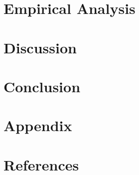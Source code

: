 \documentclass[
  12pt,
  a4paper,
  oneside]{article}
\begin{document}
\section{Empirical Analysis}\label{empirical-analysis}

\section{Discussion}\label{discussion}

\section{Conclusion}\label{conclusion}

\appendix

\section{\texorpdfstring{Appendix
\label{appendixa}}{Appendix }}\label{appendix}

\section*{References}\label{references}

\pagestyle{plain}
\end{document}

